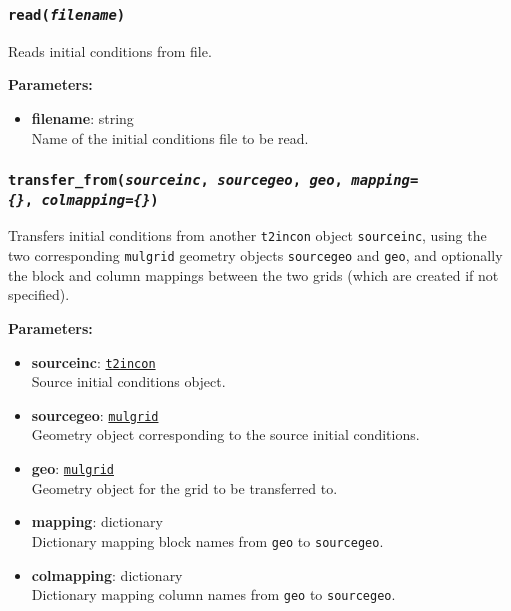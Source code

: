 \begin{snugshade}
\subsubsection{\texttt{read(\emph{filename})}}
\end{snugshade}
\label{sec:t2incon:read}

Reads initial conditions from file.

\textbf{Parameters:}
\begin{itemize}
\item \textbf{filename}: string\\
  Name of the initial conditions file to be read.
\end{itemize}

\begin{snugshade}
\subsubsection{\texttt{transfer\_from(\emph{sourceinc}, \emph{sourcegeo}, \emph{geo}, \emph{mapping=\{\}},\
    \emph{colmapping=\{\}})}}
\end{snugshade}
\label{sec:t2incon:transfer_from}

Transfers initial conditions from another \texttt{t2incon} object \texttt{sourceinc}, using the two corresponding \texttt{mulgrid} geometry objects \texttt{sourcegeo} and \texttt{geo}, and optionally the block and column mappings between the two grids (which are created if not specified).

\textbf{Parameters:}
\begin{itemize}
\item \textbf{sourceinc}: \hyperref[incons]{\texttt{t2incon}}\\
  Source initial conditions object.
\item \textbf{sourcegeo}: \hyperref[mulgrids]{\texttt{mulgrid}}\\
  Geometry object corresponding to the source initial conditions.
\item \textbf{geo}: \hyperref[mulgrids]{\texttt{mulgrid}}\\
  Geometry object for the grid to be transferred to.
\item \textbf{mapping}: dictionary\\
  Dictionary mapping block names from \texttt{geo} to \texttt{sourcegeo}.
\item \textbf{colmapping}: dictionary\\
  Dictionary mapping column names from \texttt{geo} to \texttt{sourcegeo}.
\end{itemize}

